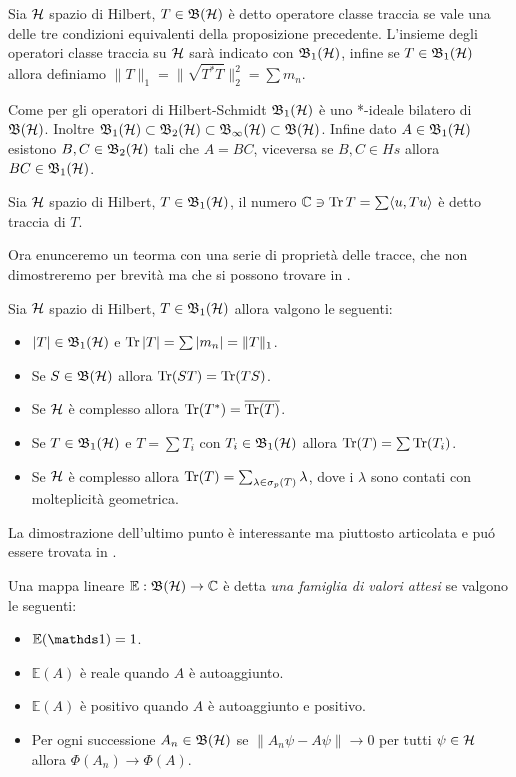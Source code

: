 \begin{definition}
    Sia $\operatorname{\mathcal{H}}$ spazio di Hilbert, $T\in \operatorname{\mathfrak{B}(\mathcal{H})}$ è detto operatore classe traccia se vale una delle tre condizioni equivalenti della proposizione precedente. L'insieme degli operatori classe traccia su $\operatorname{\mathcal{H}}$ sarà indicato con $\operatorname{\mathfrak{B}_1(\mathcal{H})}$, infine se $T \in \operatorname{\mathfrak{B}_1(\mathcal{H})}$ allora definiamo $\| T\|_1 = \| \sqrt{T^*T}\|_2^2= \sum m_n$.
\end{definition}

Come per gli operatori di Hilbert-Schmidt $\operatorname{\mathfrak{B}_1(\mathcal{H})}$ è uno *-ideale bilatero di $\operatorname{\mathfrak{B}(\mathcal{H})}$. Inoltre $\operatorname{\mathfrak{B}_1(\mathcal{H})} \subset \operatorname{\mathfrak{B}_2(\mathcal{H})} \subset \operatorname{\mathfrak{B}_\infty(\mathcal{H})} \subset \operatorname{\mathfrak{B}(\mathcal{H})}$. Infine dato $A\in \operatorname{\mathfrak{B}_1(\mathcal{H})}$ esistono $B, C \in \operatorname{\mathfrak{B}_2(\mathcal{H})}$ tali che $A = BC$, viceversa se $B,C \in Hs$ allora $BC \in \operatorname{\mathfrak{B}_1(\mathcal{H})}$.  
\begin{definition}
    Sia $\operatorname{\mathcal{H}}$ spazio di Hilbert, $T\in \operatorname{\mathfrak{B}_1(\mathcal{H})}$, il numero $\mathbb{C} \ni \Tr T = \sum \langle u, Tu \rangle$ è detto traccia di $T$.
\end{definition}

Ora enunceremo un teorma con una serie di proprietà delle tracce, che non dimostreremo per brevità ma che si possono trovare in \cite{Mor}.

\begin{theorem}
    Sia $\operatorname{\mathcal{H}}$ spazio di Hilbert, $T \in \operatorname{\mathfrak{B}_1(\mathcal{H})}$ allora valgono le seguenti:
\begin{itemize}
    \item $|T| \in \operatorname{\mathfrak{B}_1(\mathcal{H})}$ e $\Tr |T| = \sum |m_n|=\|T\|_1$.
    \item Se $S \in \operatorname{\mathfrak{B}(\mathcal{H})}$ allora $\Tr(ST) = \Tr(TS)$.
    \item Se $\operatorname{\mathcal{H}}$ è complesso allora $\Tr(T^*) = \overline{\Tr(T)}$.
    \item Se $T \in \operatorname{\mathfrak{B}_1(\mathcal{H})}$ e $T = \sum T_i$ con $T_i \in \operatorname{\mathfrak{B}_1(\mathcal{H})}$ allora $\Tr(T) = \sum \Tr(T_i)$.
    \item Se $\operatorname{\mathcal{H}}$ è complesso allora $\Tr(T) = \sum_{\lambda \in \sigma_p(T)} \lambda$, dove i $\lambda$ sono contati con molteplicità geometrica. 
\end{itemize}
\end{theorem}

La dimostrazione dell'ultimo punto è interessante ma piuttosto articolata e puó essere trovata in \cite{Bir}. 


\begin{definition}
    Una mappa lineare $\mathbb{E}: \operatorname{\mathfrak{B}(\mathcal{H})} \to \mathbb{C}$ è detta \emph{ una famiglia di valori attesi} se valgono le seguenti:

\begin{itemize}
    \item $\mathbb{E}(\un) = 1$.
    \item $\mathbb{E}(A)$ è reale quando $A$ è autoaggiunto.
    \item $\mathbb{E}(A)$ è positivo quando $A$ è autoaggiunto e positivo.
    \item Per ogni successione $A_n \in \operatorname{\mathfrak{B}(\mathcal{H})}$ se $\| A_n\psi - A \psi\| \to 0$ per tutti $\psi \in \operatorname{\mathcal{H}}$ allora $\Phi(A_n) \to \Phi(A)$.
\end{itemize}
\end{definition}

